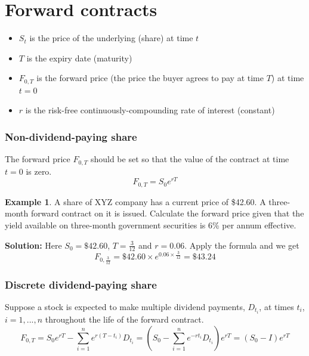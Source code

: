 \documentclass[11pt,a4paper]{book}
\theoremstyle{definition}\newtheorem{definition}{Definition}
\theoremstyle{definition}\newtheorem{fact}{Fact}
\theoremstyle{definition}\newtheorem{remark}{Remark}
\theoremstyle{definition}\newtheorem{ex}{Ex.}
\theoremstyle{definition}\newtheorem{project}{Project}
\theoremstyle{definition}\newtheorem{problem}{Problem}
\theoremstyle{definition}\newtheorem{example}{Example}
\numberwithin{theorem}{section}
\numberwithin{corollary}{chapter}
\numberwithin{assumption}{chapter}
\numberwithin{definition}{chapter}
\numberwithin{prop}{chapter}
\numberwithin{notation}{chapter}
\numberwithin{problem}{chapter}
\numberwithin{example}{chapter}
\numberwithin{fact}{chapter}
\numberwithin{ex}{chapter}
\begin{document}
\section{Forward contracts}

\begin{itemize}
\item $S_t$ is the price of the underlying (share) at time $t$
\item $T$ is the expiry date (maturity)
\item $F_{0,T}$ is the forward price (the price the buyer agrees to pay at time $T$) at time $t=0$
\item $r$ is the risk-free continuously-compounding rate of interest (constant)
\end{itemize}

\subsubsection*{Non-dividend-paying share}

The forward price $F_{0,T}$ should be set so that the value of the contract at time $t = 0$ is zero.
\begin{equation}
F_{0,T} = S_0 e^{rT}
\end{equation}

\begin{example}
A share of XYZ company has a current price of \$42.60. A three-month forward contract on it is issued. Calculate the forward price given that the yield available on three-month government securities is 6\% per annum effective.

\vspace{15pt}
\textbf{Solution:}
Here $S_0 = \$42.60$, $T = \frac{3}{12}$ and $r = 0.06$.
Apply the formula and we get
$$ F_{0,\frac{3}{12}} = \$ 42.60 \times e^{0.06 \times \frac{3}{12}} = \$ 43.24 $$
\end{example}

\subsubsection*{Discrete dividend-paying share}

Suppose a stock is expected to make multiple dividend payments, $D_{t_i}$, at times $t_i$, $i=1,...,n$ throughout the life of the forward contract.
\begin{equation}
F_{0,T} = S_0 e^{rT} - \sum_{i=1}^n e^{r(T-t_i)}D_{t_i} = \left(S_0 - \sum_{i=1}^n e^{-rt_i} D_{t_i} \right) e^{rT} = (S_0 - I) e^{rT}
\end{equation}
\end{document}
